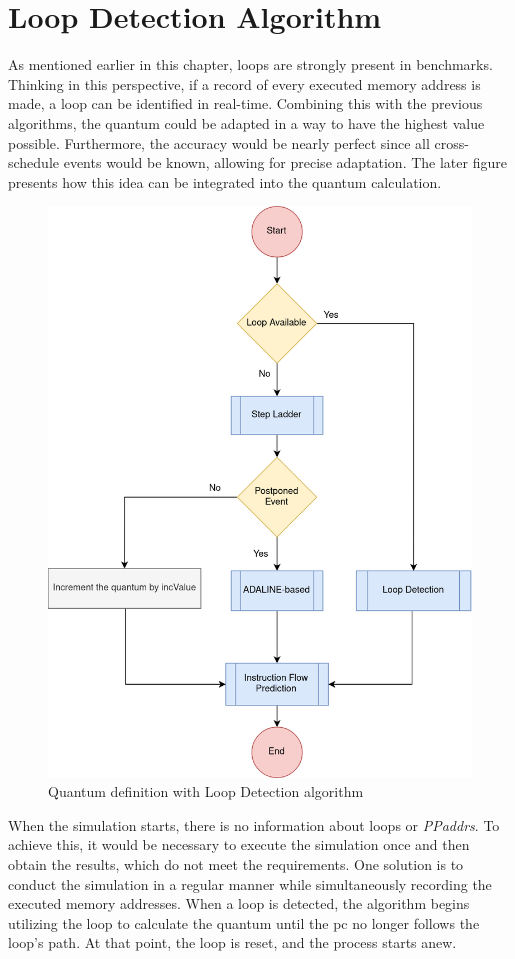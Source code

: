 \section{Loop Detection Algorithm}

As mentioned earlier in this chapter, loops are strongly present in benchmarks. Thinking in this perspective, if a record of every executed 
memory address is made, a loop can be identified in real-time. Combining this with the previous algorithms, the quantum could be adapted in a way 
to have the highest value possible. Furthermore, the accuracy would be nearly perfect since all cross-schedule events would be known, allowing 
for precise adaptation. The later figure presents how this idea can be integrated into the quantum calculation.


\begin{figure}[h!]
	\centering
 	\includegraphics[width=0.55\linewidth]{Images/ADA_and_REP.png}
 	\caption{Quantum definition with Loop Detection algorithm}
	 \label{fig_ADA_and_REP}
\end{figure}


When the simulation starts, there is no information about loops or \textit{PPaddrs}. To achieve this, it would be necessary to execute the simulation 
once and then obtain the results, which do not meet the requirements. One solution is to conduct the simulation in a regular manner while 
simultaneously recording the executed memory addresses. When a loop is detected, the algorithm begins utilizing the loop to calculate the quantum 
until the \gls{pc} no longer follows the loop's path. At that point, the loop is reset, and the process starts anew.


